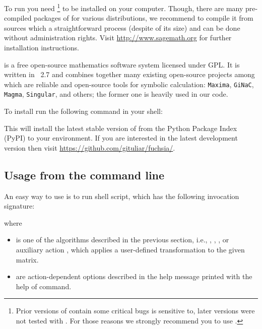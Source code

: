 \documentclass[12pt,a4paper]{article}
\begin{document}
To run \fuchsia you need \footnote{Prior versions of \sage contain some critical bugs \fuchsia is sensitive to, later versions were not tested with \fuchsia.
For those reasons we strongly recommend you to use .} to be installed on your computer.
Though, there are many pre-compiled packages of \sage for various \linux distributions, we recommend to compile it from sources which a straightforward process (despite of its size) and can be done without administration rights.
Visit \url{http://www.sagemath.org} for further installation instructions.

\sage is a free open-source mathematics software system licensed under GPL.
It is written in \python~2.7 and combines together many existing open-source projects among which are reliable and open-source tools for symbolic calculation: \texttt{Maxima}, \texttt{GiNaC}, \texttt{Magma}, \texttt{Singular}, and others; the former one is heavily used in our code.

To install \fuchsia run the following command in your shell:


This will install the latest stable version of \fuchsia from the Python Package Index (PyPI) to your \sage environment.
If you are interested in the latest development version then visit \url{https://github.com/gituliar/fuchsia/}.

\subsection{Usage from the command line}

An easy way to use \fuchsia is to run  shell script, which has the following invocation signature:


where
\begin{itemize}
  \item {} is one of the algorithms described in the previous section, i.e., , , , or auxiliary action , which applies a user-defined transformation to the given matrix.
  \item {} are action-dependent options described in the help message printed with the help of  command.
\end{itemize}
\end{document}
